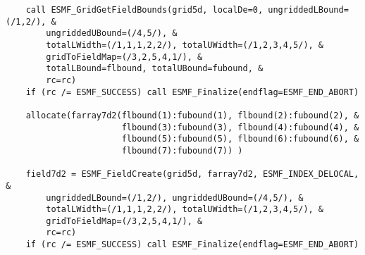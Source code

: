  \begin{verbatim}
    call ESMF_GridGetFieldBounds(grid5d, localDe=0, ungriddedLBound=(/1,2/), &
        ungriddedUBound=(/4,5/), &
        totalLWidth=(/1,1,1,2,2/), totalUWidth=(/1,2,3,4,5/), &
        gridToFieldMap=(/3,2,5,4,1/), &
        totalLBound=flbound, totalUBound=fubound, &
        rc=rc)
    if (rc /= ESMF_SUCCESS) call ESMF_Finalize(endflag=ESMF_END_ABORT)

    allocate(farray7d2(flbound(1):fubound(1), flbound(2):fubound(2), &
                       flbound(3):fubound(3), flbound(4):fubound(4), &
                       flbound(5):fubound(5), flbound(6):fubound(6), &
                       flbound(7):fubound(7)) )

    field7d2 = ESMF_FieldCreate(grid5d, farray7d2, ESMF_INDEX_DELOCAL, &
        ungriddedLBound=(/1,2/), ungriddedUBound=(/4,5/), &
        totalLWidth=(/1,1,1,2,2/), totalUWidth=(/1,2,3,4,5/), &
        gridToFieldMap=(/3,2,5,4,1/), &
        rc=rc)
    if (rc /= ESMF_SUCCESS) call ESMF_Finalize(endflag=ESMF_END_ABORT)
 
\end{verbatim}

\setlength{\parskip}{\oldparskip}
\setlength{\parindent}{\oldparindent}
\setlength{\baselineskip}{\oldbaselineskip}
